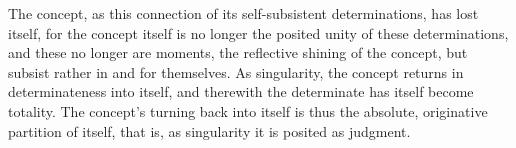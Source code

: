 The concept, as this connection of
its self-subsistent determinations,
has lost itself,
for the concept itself is no longer
the posited unity of these determinations,
and these no longer are moments,
the reflective shining of the concept,
but subsist rather in and for themselves.
As singularity, the concept returns
in determinateness into itself,
and therewith the determinate has
itself become totality.
The concept's turning back into itself is
thus the absolute, originative partition of itself,
that is, as singularity it is posited as judgment.
